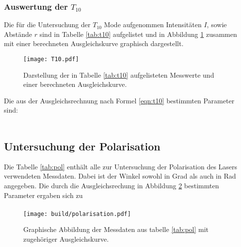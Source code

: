 \subsubsection{Auswertung der $T_{10}$}
Die für die Untersuchung der $T_{10}$ Mode aufgenommen Intensitäten $I$,
sowie Abstände $r$ sind in Tabelle \ref{tab:t10} aufgelistet und in
Abbildung \ref{plt:t10} zusammen mit einer berechneten Ausgleichskurve
graphisch dargestellt.



\begin{figure}[htb]
  \centering
  \texttt{[image: T10.pdf]}
  \caption{Darstellung der in Tabelle \ref{tab:t10} aufgelisteten Messwerte und einer berechneten Ausgleichskurve.}
  \label{plt:t10}
\end{figure}

Die aus der Ausgleichsrechnung nach Formel \ref{eqn:t10} bestimmten
Parameter sind:

\begin{align*}
\end{align*}

\subsection{Untersuchung der Polarisation}
Die Tabelle \ref{tab:pol} enthält alle zur Untersuchung der Polarisation
des Lasers verwendeten Messdaten. Dabei ist der Winkel sowohl in Grad als
auch in Rad angegeben.
Die durch die Ausgleichsrechung in Abbildung \ref{plt:pol} bestimmten
Parameter ergaben sich zu
\begin{align*}
\end{align*}

\begin{figure}[htb]
  \centering
  \texttt{[image: build/polarisation.pdf]}
  \caption{Graphische Abbildung der Messdaten aus tabelle \ref{tab:pol} mit zugehöriger Ausgleichskurve.}
  \label{plt:pol}
\end{figure}



